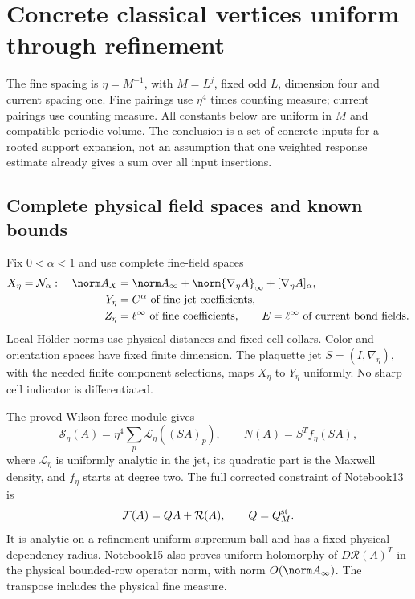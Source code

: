 \section{Concrete classical vertices uniform through refinement}
\label{cv-section}

The fine spacing is $\eta=M^{-1}$, with $M=L^j$, fixed odd
$L$, dimension four and current spacing one. Fine pairings
use $\eta^4$ times counting measure; current pairings use
counting measure. All constants below are uniform in $M$ and
compatible periodic volume. The conclusion is a set of concrete
inputs for a rooted support expansion, not an assumption that
one weighted response estimate already gives a sum over all
input insertions.

\subsection{Complete physical field spaces and known bounds}
\label{cv-spaces-section}

Fix $0<\alpha<1$ and use complete fine-field spaces
\begin{equation}\label{cv-spaces}
 \begin{split}
 X_\eta=\mathcal N_\alpha:\quad
 \norm A_X&=\norm A_\infty+\norm{\nabla_\eta A}_\infty
                         +[\nabla_\eta A]_\alpha,\\
 Y_\eta&=C^\alpha\text{ of fine jet coefficients},\\
 Z_\eta&=\ell^\infty\text{ of fine coefficients},\qquad
 E=\ell^\infty\text{ of current bond fields}.
 \end{split}
\end{equation}
Local H\"older norms use physical distances and fixed cell
collars. Color and orientation spaces have fixed finite
dimension. The plaquette jet $S=(I,\nabla_\eta)$, with the
needed finite component selections, maps $X_\eta$ to $Y_\eta$
uniformly. No sharp cell indicator is differentiated.

The proved Wilson-force module gives
\[
 \mathcal S_\eta(A)=\eta^4\sum_p\mathcal L_\eta((SA)_p),
 \qquad N(A)=S^Tf_\eta(SA),
\]
where $\mathcal L_\eta$ is uniformly analytic in the jet,
its quadratic part is the Maxwell density, and $f_\eta$ starts
at degree two. The full corrected constraint of Notebook13 is
\[
 \mathcal F(A)=QA+\mathcal R(A),\qquad Q=Q_M^{\rm st}.
\]
It is analytic on a refinement-uniform supremum ball and has
a fixed physical dependency radius. Notebook15 also proves
uniform holomorphy of $D\mathcal R(A)^T$ in the physical
bounded-row operator norm, with norm $O(\norm A_\infty)$.
The transpose includes the physical fine measure.

